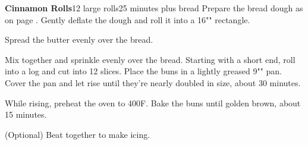 \documentclass[../Cookbook.tex]{subfiles}
\begin{document}
\begin{recipe}[CinnamonRolls]{\textbf{Cinnamon Rolls}}{12 large rolls}{25 minutes plus bread}
	Prepare the bread dough as on page \pageref{BaseDessertBread}.
	Gently deflate the dough and roll it into a 16"" rectangle.
	
	Spread the butter evenly over the bread.
	
	Mix together and sprinkle evenly over the bread.
	Starting with a short end, roll into a log and cut into 12 slices.
	Place the buns in a lightly greased 9"" pan.
	Cover the pan and let rise until they're nearly doubled in size, about 30 minutes.
	
	While rising, preheat the oven to 400\0F.
	Bake the buns until golden brown, about 15 minutes.
	
	(Optional) Beat together to make icing.
\end{recipe}
\end{document}
